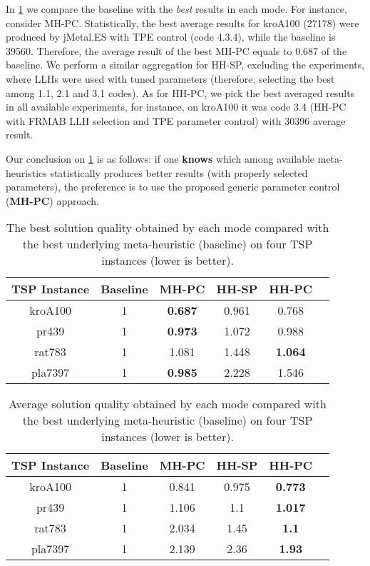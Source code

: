 In \cref{eval:1: best final results comparison table} we compare the baseline with the \emph{best} results in each mode. For instance, consider MH-PC. Statistically, the best average results for kroA100 (27178) were produced by jMetal.ES with TPE control (code 4.3.4), while the baseline is 39560. Therefore, the average result of the best MH-PC equals to 0.687 of the baseline. We perform a similar aggregation for HH-SP, excluding the experiments, where LLHs were used with tuned parameters (therefore, selecting the best among 1.1, 2.1 and 3.1 codes). As for HH-PC, we pick the best averaged results in all available experiments, for instance, on kroA100 it was code 3.4 (HH-PC with FRMAB LLH selection and TPE parameter control) with 30396 average result.

Our conclusion on \cref{eval:1: best final results comparison table} is as follows: if one \textbf{knows} which among available meta-heuristics statistically produces better results (with properly selected parameters), the preference is to use the proposed generic parameter control (\textbf{MH-PC}) approach. 

\begin{samepage}
	\begin{table}[!htbp]
		\caption{The best solution quality obtained by each mode compared with the best underlying meta-heuristic (baseline) on four TSP instances (lower is better).}
		\label{eval:1: best final results comparison table}
		\begin{tabular}{cccccc}
			\hline
			\rowcolor{gray!10}
			\textbf{TSP Instance} & \textbf{Baseline} & \textbf{MH-PC} & \textbf{HH-SP} & \textbf{HH-PC} \\
			\hline		
			kroA100 & 1 & \textbf{0.687} & 0.961 & 0.768 \\
			pr439 & 1 & \textbf{0.973} & 1.072 & 0.988 \\
			rat783 	& 1 & 1.081 & 1.448 & \textbf{1.064} \\
			pla7397 & 1 & \textbf{0.985} & 2.228 & 1.546 \\
			\hline
		\end{tabular}
	\end{table}
	
	
	\begin{table}[!htbp]
		\caption{Average solution quality obtained by each mode compared with the best underlying meta-heuristic (baseline) on four TSP instances (lower is better).}
		\label{eval:1: avg final results comparison table}
		\begin{tabular}{cccccc}
			\hline
			\rowcolor{gray!10}
			\textbf{TSP Instance} & \textbf{Baseline} & \textbf{MH-PC} & \textbf{HH-SP} & \textbf{HH-PC} \\
			\hline		
			kroA100 & 1 & 0.841 & 0.975 & \textbf{0.773} \\
			pr439 & 1 & 1.106 & 1.1 & \textbf{1.017} \\
			rat783 	& 1 & 2.034 & 1.45 & \textbf{1.1} \\
			pla7397 & 1 & 2.139 & 2.36 & \textbf{1.93} \\
			\hline
		\end{tabular}
	\end{table}
\end{samepage}

